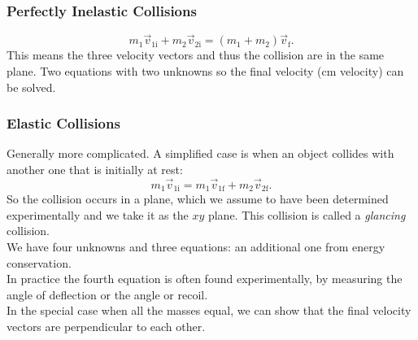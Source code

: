 \documentclass[11pt,letterpaper]{report}
\begin{document}
\subsubsection{Perfectly Inelastic Collisions}
$$m_1 \vec{v}_{1\mathrm{i}} + m_2 \vec{v}_{2\mathrm{i}} = \left(m_1 + m_2\right) \vec{v}_\mathrm{f}.$$
This means the three velocity vectors and thus the collision are in the same plane. Two equations with two unknowns so the final velocity (cm velocity) can be solved.

\subsubsection{Elastic Collisions}
Generally more complicated. A simplified case is when an object collides with another one that is initially at rest: $$m_1 \vec{v}_{1\mathrm{i}} = m_1 \vec{v}_{1\mathrm{f}} + m_2 \vec{v}_{2\mathrm{f}}.$$
So the collision occurs in a plane, which we assume to have been determined experimentally and we take it as the $xy$ plane. This collision is called a \textit{glancing} collision.
\\We have four unknowns and three equations: an additional one from energy conservation.
\\In practice the fourth equation is often found experimentally, by measuring the angle of deflection or the angle or recoil.
\\In the special case when all the masses equal, we can show that the final velocity vectors are perpendicular to each other.
\end{document}
